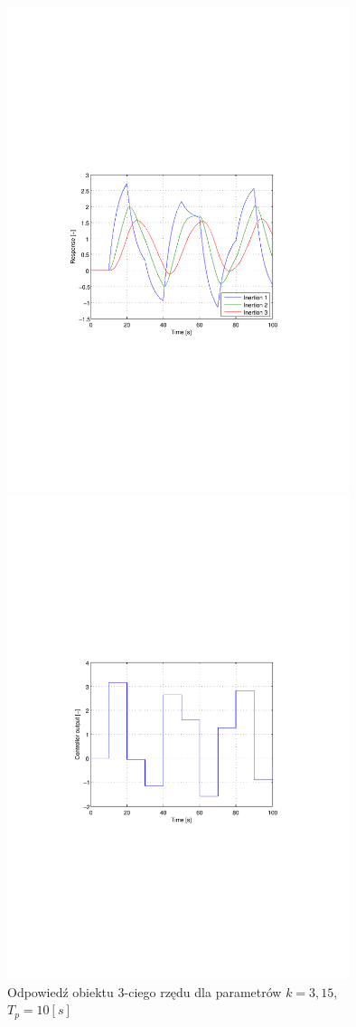 \documentclass[12pt]{article}
\begin{document}
\newpage

\begin{figure}[!htb]
	\begin{center}
		\includegraphics[trim=5cm 9cm 5cm 9cm,width=10cm]{../res/img/d2_10_3,15y.pdf}
	\end{center}
	
	\begin{center}
		\includegraphics[trim=5cm 9cm 5cm 9cm,width=10cm]{../res/img/d2_10_3,15u.pdf} 
	\end{center}
	\caption{Odpowiedź obiektu 3-ciego rzędu dla parametrów $k=3,15$,
	$T_p=10[s]$}
\end{figure}
\end{document}
